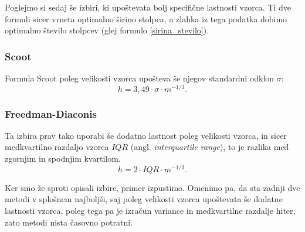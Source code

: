 \pagebreak
Poglejmo si sedaj še izbiri, ki upoštevata bolj specifične lastnosti vzorca. Ti dve formuli sicer vrneta optimalno širino stolpca, a zlahka iz tega podatka dobimo optimalno število stolpcev (glej formulo \eqref{sirina_stevilo}). 

\subsubsection{Scoot}
Formula Scoot poleg velikosti vzorca upošteva še njegov standardni odklon $\sigma$:
\begin{equation}
    h = 3,49 \cdot \sigma \cdot m^{-1/3}.
\end{equation}

\subsubsection{Freedman-Diaconis}
Ta izbira prav tako uporabi še dodatno lastnost poleg velikosti vzorca, in sicer medkvartilno razdaljo vzorca $IQR$ (angl. \textit{interquartile range}), to je razlika med zgornjim in spodnjim kvartilom. 
\begin{equation}
    h = 2 \cdot IQR \cdot m^{-1/3}.
\end{equation}

Ker smo že sproti opisali izbire, primer izpustimo. Omenimo pa, da sta zadnji dve metodi v splošnem najboljši, saj poleg velikosti vzorca upoštevata še dodatne lastnosti vzorca, poleg tega pa je izračun variance in medkvartilne razdalje hiter, zato metodi nista časovno potratni.